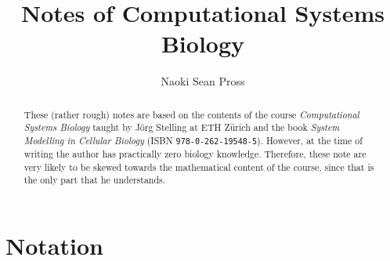 \documentclass[a4paper]{article}
\title{Notes of Computational Systems Biology}
\author{Naoki Sean Pross}
\theoremstyle{plain}
\theoremstyle{definition}
\theoremstyle{remark}
\begin{document}
\maketitle

\begin{abstract}
  These (rather rough) notes are based on the contents of the course
  \emph{Computational Systems Biology} taught by Jörg Stelling at ETH Zürich
  and the book \emph{System Modelling in Cellular Biology} (ISBN
  \texttt{978-0-262-19548-5}). However, at the time of writing the author has
  practically zero biology knowledge. Therefore, these note are very likely to
  be skewed towards the mathematical content of the course, since that is the
  only part that he understands.
\end{abstract}

\tableofcontents

\clearpage


\section*{Notation}
\end{document}
